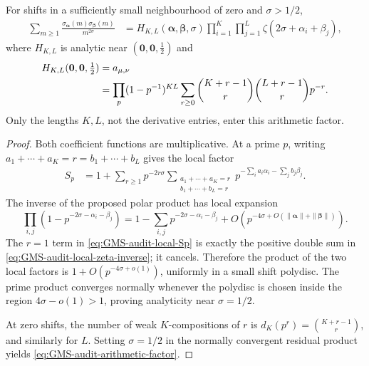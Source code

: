 \begin{lemma}
\label{lem:GMS-audit-Euler-factorization}
For shifts in a sufficiently small neighbourhood of zero and $\sigma>1/2$,
\begin{align}
 \sum_{m\geq1}\frac{\sigma_{\boldsymbol\alpha}(m)
 \sigma_{\boldsymbol\beta}(m)}{m^{2\sigma}}
 &=H_{K,L}(\boldsymbol\alpha,\boldsymbol\beta,\sigma)
 \prod_{i=1}^{K}\prod_{j=1}^{L}
 \zeta(2\sigma+\alpha_i+\beta_j),
 \label{eq:GMS-audit-Euler-factorization}
\end{align}
where $H_{K,L}$ is analytic near
$(\boldsymbol0,\boldsymbol0,\tfrac12)$ and
\begin{align}
 H_{K,L}(\boldsymbol0,\boldsymbol0,\tfrac12)
 &=a_{\mu,\nu}\notag\\
 &=\prod_p(1-p^{-1})^{KL}
 \sum_{r\geq0}
 \binom{K+r-1}{r}\binom{L+r-1}{r}p^{-r}.
 \label{eq:GMS-audit-arithmetic-factor}
\end{align}
Only the lengths $K,L$, not the derivative entries, enter this arithmetic factor.
\end{lemma}

\begin{proof}
Both coefficient functions are multiplicative.  At a prime $p$, writing
$a_1+\cdots+a_K=r=b_1+\cdots+b_L$ gives the local factor
\begin{align}
 S_p&=1+\sum_{r\geq1}p^{-2r\sigma}
 \sum_{\substack{a_1+\cdots+a_K=r\\b_1+\cdots+b_L=r}}
 p^{-\sum_i a_i\alpha_i-\sum_jb_j\beta_j}.
 \label{eq:GMS-audit-local-Sp}
\end{align}
The inverse of the proposed polar product has local expansion
\begin{equation}
 \prod_{i,j}(1-p^{-2\sigma-\alpha_i-\beta_j})
 =1-\sum_{i,j}p^{-2\sigma-\alpha_i-\beta_j}
 +O(p^{-4\sigma+O(\|\boldsymbol\alpha\|+\|\boldsymbol\beta\|)}).
 \label{eq:GMS-audit-local-zeta-inverse}
\end{equation}
The $r=1$ term in \eqref{eq:GMS-audit-local-Sp} is exactly the positive double sum in
\eqref{eq:GMS-audit-local-zeta-inverse}; it cancels.  Therefore the product of the two local
factors is $1+O(p^{-4\sigma+o(1)})$, uniformly in a small shift polydisc.  The prime product
converges normally whenever the polydisc is chosen inside the region
$4\sigma-o(1)>1$, proving analyticity near $\sigma=1/2$.

At zero shifts, the number of weak $K$-compositions of $r$ is
$d_K(p^r)=\binom{K+r-1}{r}$, and similarly for $L$.  Setting
$\sigma=1/2$ in the normally convergent residual product yields
\eqref{eq:GMS-audit-arithmetic-factor}.
\end{proof}

